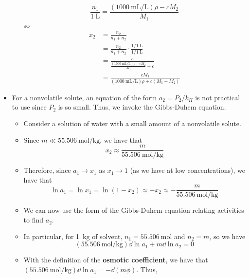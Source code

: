 \documentclass[../notes.tex]{subfiles}
\begin{document}
\begin{itemize}
\begin{itemize}
        \begin{equation*}
            \frac{n_1}{\SI{1}{\liter}} = \frac{(\SI{1000}{\milli\liter\per\liter})\rho-cM_2}{M_1}
        \end{equation*}
        so
        \begin{align*}
            x_2 &= \frac{n_2}{n_1+n_2}\\
            &= \frac{n_2}{n_1+n_2}\cdot\frac{1/\SI{1}{\liter}}{1/\SI{1}{\liter}}\\
            &= \frac{c}{\frac{(\SI{1000}{\milli\liter\per\liter})\rho-cM_2}{M_1}+c}\\
            &= \frac{cM_1}{(\SI{1000}{\milli\liter\per\liter})\rho+c(M_1-M_2)}
        \end{align*}
    \end{itemize}
    \item For a nonvolatile solute, an equation of the form $a_2=P_2/k_H$ is not practical to use since $P_2$ is so small. Thus, we invoke the Gibbs-Duhem equation.
    \begin{itemize}
        \item Consider a solution of water with a small amount of a nonvolatile solute.
        \item Since $m\ll\SI{55.506}{\mole\per\kilo\gram}$, we have that
        \begin{equation*}
            x_2 \approx \frac{m}{\SI{55.506}{\mole\per\kilo\gram}}
        \end{equation*}
        \item Therefore, since $a_1\to x_1$ as $x_1\to 1$ (as we have at low concentrations), we have that
        \begin{equation*}
            \ln a_1 = \ln x_1
            = \ln(1-x_2)
            \approx -x_2
            \approx -\frac{m}{\SI{55.506}{\mole\per\kilo\gram}}
        \end{equation*}
        \item We can now use the form of the Gibbs-Duhem equation relating activities to find $a_2$.
        \item In particular, for \SI{1}{\kilo\gram} of solvent, $n_1=\SI{55.506}{\mole}$ and $n_2=m$, so we have
        \begin{equation*}
            (\SI{55.506}{\mole\per\kilo\gram})\dd{\ln a_1}+m\dd{\ln a_2} = 0
        \end{equation*}
        \item With the definition of the \textbf{osmotic coefficient}, we have that $(\SI{55.506}{\mole\per\kilo\gram})\dd{\ln a_1}=-\dd{(m\phi)}$. Thus,

\end{itemize}
\end{itemize}
\end{document}
